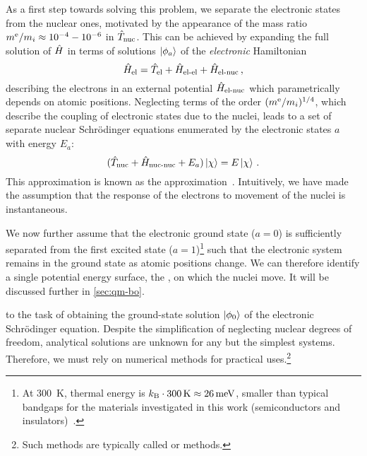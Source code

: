As a first step towards solving this problem, we separate the electronic states from the nuclear ones, motivated by the appearance of the mass ratio $m^\text{e}/m_i \approx 10^{-4} - 10^{-6}$ in $\hat T_{\text{nuc}}$. 
This can be achieved by expanding the full solution of $\hat H$ in terms of solutions $\ket{\phi_a}$ of the \emph{electronic} Hamiltonian
\begin{equation}
	\Hel = \op{T}_{\text{el}} + \op{H}_{\text{el-el}} + \op{H}_{\text{el-nuc}}  \,, \label{eq:qm-he}
\end{equation}
describing the electrons in an external potential $\hat H_{\text{el-nuc}}$ which parametrically depends on atomic positions.
Neglecting terms of the order $(m^\text{e}/m_i)^{1/4}$, which describe the coupling of electronic states due to the nuclei, leads to a set of separate nuclear Schrödinger equations enumerated by the electronic states $a$ with energy $E_a$:
\begin{equation}
	(\op{T}_{\text{nuc}} + \op{H}_{\text{nuc-nuc}} + E_a) \ket{\chi} = E \ket{\chi} \, . \label{eq:qm-nse}
\end{equation}
This approximation is known as the  approximation~\cite{bo1927p}.
Intuitively, we have made the assumption that the response of the electrons to movement of the nuclei is instantaneous.

We now further assume that the electronic ground state ($a{=}0$) is sufficiently separated from the first excited state ($a{=}1$)\footnote{At \qty{300}{K}, thermal energy is $k_{\rm B} \cdot \qty{300}{K}  \approx \qty{26}{meV}$, smaller than typical bandgaps for the materials investigated in this work (semiconductors and insulators)~\cite[ch.~28]{ashcroft1976}.} such that the electronic system remains in the ground state as atomic positions change. We can therefore identify a single potential energy surface, the \bo \pes, on which the nuclei move. It will be discussed further in \cref{sec:qm-bo}.

 to the task of obtaining the ground-state solution $\ket{\phi_0}$ of the electronic Schrödinger equation. Despite the simplification of neglecting nuclear degrees of freedom, analytical solutions are unknown for any but the simplest systems.
Therefore, we must rely on numerical methods for practical uses.\footnote[][-2\baselineskip]{Such methods are typically called  or  methods.}

